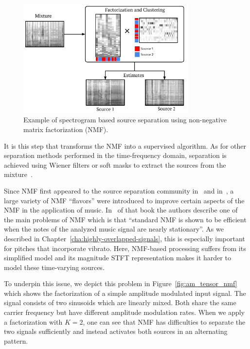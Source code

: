 \begin{figure}[h]
  \centering
  \includegraphics[width=0.8\textwidth]{Chapters/06_Separation_Unknown/figures/nmf_separation.pdf}
  \caption{Example of spectrogram based source separation using non-negative matrix factorization (NMF).}
  \label{fig:nmf_separation}
\end{figure}

It is this step that transforms the NMF into a supervised algorithm.
As for other separation methods performed in the time-frequency domain, separation is achieved using Wiener filters or soft masks to extract the sources from the mixture~\cite{liutkus15c}.
\par
Since NMF first appeared to the source separation community in~\cite{smaragdis03} and in~\cite{vembu05}, a large variety of NMF ``flavors'' were introduced to improve certain aspects of the NMF in the application of music. 
In~\cite[Chapter 16]{vincent} of that book the authors describe one of the main problems of NMF which is that ``standard NMF is shown to be efficient when the notes of the analyzed music signal are nearly stationary''.
As we described in Chapter~\ref{cha:highly-overlapped-signals}, this is especially important for pitches that incorporate vibrato.
Here, NMF-based processing suffers from its simplified model and its magnitude STFT representation  makes it harder to model these time-varying sources.
\par
To underpin this issue, we depict this problem in Figure~\ref{fig:am_tensor_nmf} which shows the factorization of a simple amplitude modulated input signal. 
The signal consists of two sinusoids which are linearly mixed. 
Both share the same carrier frequency but have different amplitude modulation rates. 
When we apply a factorization with $K=2$, one can see that NMF has difficulties to separate the two signals sufficiently and instead activates both sources in an alternating pattern.

